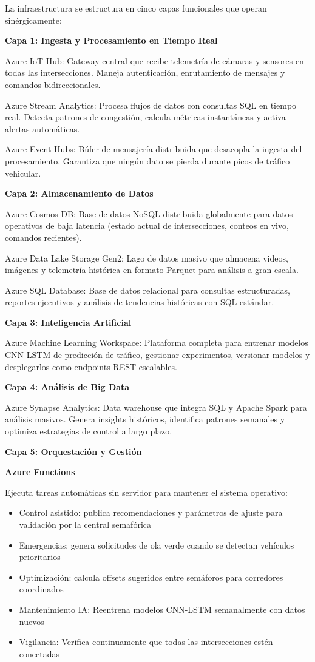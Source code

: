 \documentclass[12pt,a4paper,oneside]{report}
\begin{document}
La infraestructura se estructura en cinco capas funcionales que operan sinérgicamente:

\textbf{Capa 1: Ingesta y Procesamiento en Tiempo Real}

Azure IoT Hub: Gateway central que recibe telemetría de cámaras y sensores en todas las intersecciones. Maneja autenticación, enrutamiento de mensajes y comandos bidireccionales.

Azure Stream Analytics: Procesa flujos de datos con consultas SQL en tiempo real. Detecta patrones de congestión, calcula métricas instantáneas y activa alertas automáticas.

Azure Event Hubs: Búfer de mensajería distribuida que desacopla la ingesta del procesamiento. Garantiza que ningún dato se pierda durante picos de tráfico vehicular.

\textbf{Capa 2: Almacenamiento de Datos}

Azure Cosmos DB: Base de datos NoSQL distribuida globalmente para datos operativos de baja latencia (estado actual de intersecciones, conteos en vivo, comandos recientes).

Azure Data Lake Storage Gen2: Lago de datos masivo que almacena videos, imágenes y telemetría histórica en formato Parquet para análisis a gran escala.

Azure SQL Database: Base de datos relacional para consultas estructuradas, reportes ejecutivos y análisis de tendencias históricas con SQL estándar.

\textbf{Capa 3: Inteligencia Artificial}

Azure Machine Learning Workspace: Plataforma completa para entrenar modelos CNN-LSTM de predicción de tráfico, gestionar experimentos, versionar modelos y desplegarlos como endpoints REST escalables.

\textbf{Capa 4: Análisis de Big Data}

Azure Synapse Analytics: Data warehouse que integra SQL y Apache Spark para análisis masivos. Genera insights históricos, identifica patrones semanales y optimiza estrategias de control a largo plazo.

\textbf{Capa 5: Orquestación y Gestión}

\textbf{Azure Functions}

Ejecuta tareas automáticas sin servidor para mantener el sistema operativo:

\begin{itemize}
\item
  Control asistido: publica recomendaciones y parámetros de ajuste para validación por la central semafórica
\item
  Emergencias: genera solicitudes de ola verde cuando se detectan vehículos prioritarios
\item
  Optimización: calcula offsets sugeridos entre semáforos para corredores coordinados
\item
  Mantenimiento IA: Reentrena modelos CNN-LSTM semanalmente con datos nuevos
\item
  Vigilancia: Verifica continuamente que todas las intersecciones estén conectadas
\end{itemize}
\end{document}
